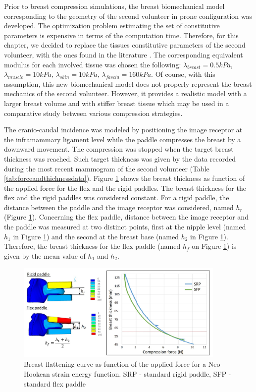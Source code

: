 Prior to breast compression simulations, the breast biomechanical model corresponding to the geometry of the second volunteer in prone configuration was developed. The optimization problem estimating the set of constitutive parameters is expensive in terms of the computation time.  Therefore, for this chapter, we decided to replace the tissues constitutive parameters of the second volunteer, with the ones found in the literature  \citep{han_nonlinear_2014,  rajagopal_modelling_2007, gefen_mechanics_2007}. The corresponding equivalent modulus for each involved tissue was chosen the following: $\lambda_{breast}=0.5 kPa$, $\lambda_{muscle}= 10kPa$, $\lambda_{skin}=10kPa$, $\lambda_{fascia}= 160kPa$.  Of course, with this assumption, this new biomechanical model does not properly represent the breast mechanics of the second volunteer.  However, it provides a realistic model with a larger breast volume and with stiffer breast tissue which may be used in a comparative study between various compression strategies.     

The cranio-caudal incidence was modeled by positioning the image receptor at the inframammary ligament level while the paddle compresses the breast by a downward movement. The compression was stopped when the target breast thickness was reached. Such target thickness was given by the data recorded during the most recent mammogram of the second volunteer (Table \ref{tab:forceandthichnessdata}). Figure \ref{fig:thicknessforcerelationNH} shows the breast thickness as function of the applied force for the flex and the rigid paddles. The breast thickness for the flex and the rigid paddles was considered constant. For a rigid paddle, the distance between the paddle and the image receptor was considered, named $h_r$  (Figure \ref{fig:thicknessforcerelationNH}). Concerning the flex paddle, distance between the image receptor and the paddle was measured at two distinct points, first at the nipple level (named $h_1$ in Figure \ref{fig:thicknessforcerelationNH}) and the second at the breast base (named $h_2$ in Figure \ref{fig:thicknessforcerelationNH}). Therefore, the breast thickness for the flex paddle (named $h_f$ on Figure \ref{fig:thicknessforcerelationNH}) is given by the mean value of $h_1$ and $h_2$. 
 
\begin{figure}[!h]
\centering
\includegraphics[width=0.9\textwidth,keepaspectratio]{figures/compressionforceNH.jpg} 
\caption{Breast flattening curve as function of the applied force for a Neo-Hookean strain energy function. SRP - standard rigid paddle, SFP -standard flex paddle}\label{fig:thicknessforcerelationNH}
\end{figure}

